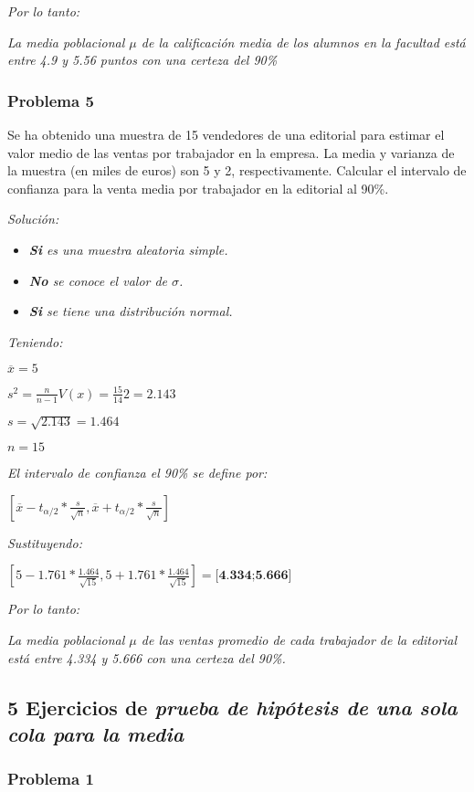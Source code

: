 \documentclass[a4paper, 12pt]{article}
\begin{document}
\emph{Por lo tanto:}

\emph{La media poblacional $\mu$ de la calificación media de los alumnos en la facultad está entre 4.9 y 5.56 puntos con una certeza del 90\%}

\subsubsection{Problema 5}
Se ha obtenido una muestra de 15 vendedores de una editorial para estimar el valor medio de las ventas por trabajador en la empresa. La media y varianza de la muestra (en miles de euros) son 5 y 2, respectivamente. Calcular el intervalo de confianza para la venta media por trabajador en la editorial al 90\%.

\emph{Solución:}

\begin{itemize}
    \item \emph{\textbf{Si} es una muestra aleatoria simple.}
    \item \emph{\textbf{No} se conoce el valor de $\sigma$.}
    \item \emph{\textbf{Si} se tiene una distribución normal.}
\end{itemize}

\emph{Teniendo:}

$\overline{x}=5$

$s^2=\frac{n}{n-1}V(x)=\frac{15}{14}2=2.143$

$s=\sqrt{2.143}=1.464$

$n=15$

\emph{El intervalo de confianza el 90\% se define por:}

$[\overline{x}-t_{\alpha/2}*\frac{s}{\sqrt{n}}, \overline{x}+t_{\alpha/2}*\frac{s}{\sqrt{n}}]$

\emph{Sustituyendo:}

$[5-1.761*\frac{1.464}{\sqrt{15}}, 5+1.761*\frac{1.464}{\sqrt{15}}]=\textbf{[4.334;5.666]}$

\emph{Por lo tanto:}

\emph{La media poblacional $\mu$ de las ventas promedio de cada trabajador de la editorial está entre 4.334 y 5.666 con una certeza del 90\%.}

\subsection{5 Ejercicios de \emph{prueba de hipótesis de una sola cola para la media}}

\subsubsection{Problema 1}
\end{document}
